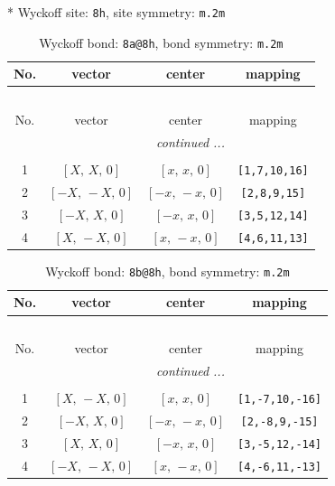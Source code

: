 \documentclass[fleqn,8pt]{jsarticle}
\begin{document}
* Wyckoff site: {\tt 8h}, site symmetry: {\tt m.2m}
\renewcommand{\arraystretch}{1.2}
\begin{longtable}{cccc}
\caption{Wyckoff bond: {\tt 8a@8h}, bond symmetry: {\tt m.2m}}
 \\
 \hline \hline
No. & vector & center & mapping \\ \hline \endfirsthead

\multicolumn{3}{l}{\tablename\ \thetable{}} \\
 \hline \hline
No. & vector & center & mapping \\ \hline \endhead

 \hline \hline
\multicolumn{3}{r}{\footnotesize\it continued ...} \\ \endfoot

 \hline \hline
\multicolumn{3}{r}{} \\ \endlastfoot

1 & $\left[ X,\, X,\, 0 \right]$ & $\left[ x,\, x,\, 0 \right]$ & {\tt [1,7,10,16]} \\ \hline
2 & $\left[ - X,\, - X,\, 0 \right]$ & $\left[ - x,\, - x,\, 0 \right]$ & {\tt [2,8,9,15]} \\ \hline
3 & $\left[ - X,\, X,\, 0 \right]$ & $\left[ - x,\, x,\, 0 \right]$ & {\tt [3,5,12,14]} \\ \hline
4 & $\left[ X,\, - X,\, 0 \right]$ & $\left[ x,\, - x,\, 0 \right]$ & {\tt [4,6,11,13]} \\
\end{longtable}
\renewcommand{\arraystretch}{1.2}
\begin{longtable}{cccc}
\caption{Wyckoff bond: {\tt 8b@8h}, bond symmetry: {\tt m.2m}}
 \\
 \hline \hline
No. & vector & center & mapping \\ \hline \endfirsthead

\multicolumn{3}{l}{\tablename\ \thetable{}} \\
 \hline \hline
No. & vector & center & mapping \\ \hline \endhead

 \hline \hline
\multicolumn{3}{r}{\footnotesize\it continued ...} \\ \endfoot

 \hline \hline
\multicolumn{3}{r}{} \\ \endlastfoot

1 & $\left[ X,\, - X,\, 0 \right]$ & $\left[ x,\, x,\, 0 \right]$ & {\tt [1,-7,10,-16]} \\ \hline
2 & $\left[ - X,\, X,\, 0 \right]$ & $\left[ - x,\, - x,\, 0 \right]$ & {\tt [2,-8,9,-15]} \\ \hline
3 & $\left[ X,\, X,\, 0 \right]$ & $\left[ - x,\, x,\, 0 \right]$ & {\tt [3,-5,12,-14]} \\ \hline
4 & $\left[ - X,\, - X,\, 0 \right]$ & $\left[ x,\, - x,\, 0 \right]$ & {\tt [4,-6,11,-13]} \\
\end{longtable}
\end{document}
